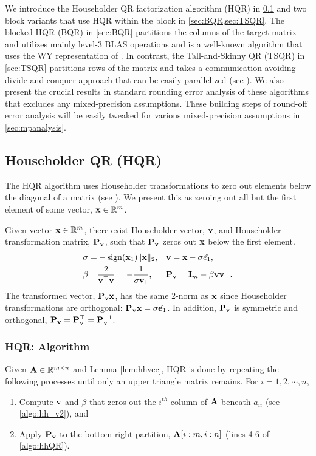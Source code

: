 We introduce the Householder QR factorization algorithm (HQR) in \cref{sec:HQR} and two block variants that use HQR within the block in \cref{sec:BQR,sec:TSQR}. 
The blocked HQR (BQR) in \cref{sec:BQR} partitions the columns of the target matrix and utilizes mainly level-3 BLAS operations and is a well-known algorithm that uses the WY representation of \cite{Bischof1987}.
In contrast, the Tall-and-Skinny QR (TSQR) in \cref{sec:TSQR} partitions rows of the matrix and takes a communication-avoiding divide-and-conquer approach that can be easily parallelized (see \cite{Demmel2007}).
We also present the crucial results in standard rounding error analysis of these algorithms that excludes any mixed-precision assumptions.
These building steps of round-off error analysis will be easily tweaked for various mixed-precision assumptions in \cref{sec:mpanalysis}.
\subsection{Householder QR (HQR)}\label{sec:HQR}
The HQR algorithm uses Householder transformations to zero out elements below the diagonal of a matrix (see \cite{Householder1958}). 
We present this as zeroing out all but the first element of some vector, $\mathbf{x}\in\mathbb{R}^m$.
\begin{lemma}
	Given vector $\mathbf{x}\in\mathbb{R}^{m}$, there exist Householder vector, $\mathbf{v}$, and Householder transformation matrix, $\mathbf{P}_{\mathbf{v}}$, such that $\mathbf{P}_{\mathbf{v}}$ zeros out $\mathbf{x}$ below the first element. 
	\begin{equation}
	\begin{alignedat}{3} 
	\sigma =& -\rm{sign}(\bb{x}_1)\|\bb{x}\|_2, &&\quad  \bb{v} = \bb{x} -\sigma \hat{e_1},\\
	\beta = & \frac{2}{\bb{v}^{\top}\bb{v}}=-\frac{1}{\sigma\bb{v}_1}, && \quad \bb{P}_{\bb{v}}=  \bb{I}_{m} - \beta \bb{v}\bb{v}^{\top}.
	\end{alignedat}
	\label{eqn:HH} 
	\end{equation}
	The transformed vector, $\mathbf{P_vx}$, has the same 2-norm as $\mathbf{x}$ since Householder transformations are orthogonal: $\mathbf{P}_{\mathbf{v}}\mathbf{x} = \sigma\hat{\mathbf{e}_1}$.
	In addition, $\mathbf{P}_{\mathbf{v}}$ is symmetric and orthogonal, $\mathbf{P}_{\mathbf{v}}=\mathbf{P}_{\mathbf{v}}^{\top}=\mathbf{P}_{\mathbf{v}}^{-1}$.
	\label{lem:hhvec}
\end{lemma}
\subsubsection{HQR: Algorithm}
Given $\mathbf{A}\in\mathbb{R}^{m\times n}$ and Lemma \ref{lem:hhvec}, HQR is done by repeating the following processes until only an upper triangle matrix remains.
For $i = 1, 2, \cdots, n,$
\begin{enumerate}[Step 1)]
	\item Compute $\mathbf{v}$ and $\beta$ that zeros out the $i^{th}$ column of $\mathbf{A}$ beneath $a_{ii}$ (see \cref{algo:hh_v2}), and
	\item Apply $\mathbf{P}_{\mathbf{v}}$ to the bottom right partition, $\mathbf{A}[i:m, i:n]$ (lines 4-6 of \cref{algo:hhQR}).
\end{enumerate}

